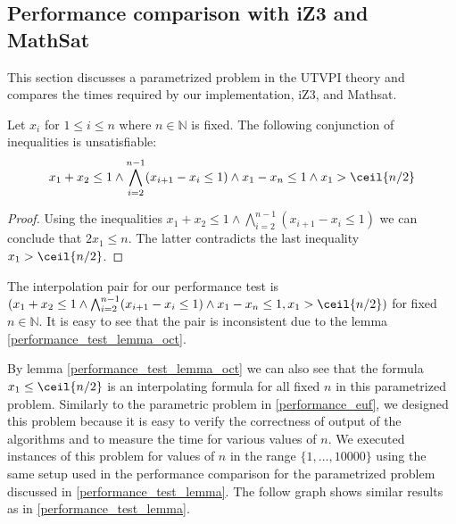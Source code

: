 \subsection{Performance comparison with iZ3 and MathSat}\label{performance_oct}

This section discusses a parametrized problem 
in the UTVPI theory and compares the times required by
our implementation, iZ3, and Mathsat.

\begin{lemma} \label{performance_test_lemma_oct}
  Let $x_i$ for $1 \leq i \leq n$ where $n \in \mathbb{N}$ is fixed.
  The following conjunction of inequalities is unsatisfiable:
  \begin{equation*}\label{oct_problem}
    x_1 + x_2 \leq 1 
    \land \bigwedge_{i=2}^{n-1} (x_{i+1} - x_i \leq 1) 
    \land x_1 - x_n \leq 1
    \land x_1 > \ceil{n/2}
  \end{equation*}
\end{lemma}

\begin{proof}
  Using the inequalities $x_1 + x_2 \leq 1 
  \land \bigwedge_{i=2}^{n-1} (x_{i+1} - x_i \leq 1)$
  we can conclude that $2x_1 \leq n$.
  The latter contradicts the last inequality $x_1 > \ceil{n/2}$.
\end{proof}

The interpolation pair for our performance test 
is $(x_1 + x_2 \leq 1 
  \land \bigwedge_{i=2}^{n-1} (x_{i+1} - x_i \leq 1) 
\land x_1 - x_n \leq 1, x_1 > \ceil{n/2})$
for fixed $n \in \mathbb{N}$.
It is easy to see that the pair is inconsistent due to the lemma 
\ref{performance_test_lemma_oct}. 

By lemma \ref{performance_test_lemma_oct}
we can also see that the formula $x_1 \leq \ceil{n/2}$ is an 
interpolating formula for all fixed $n$ in this parametrized problem.
Similarly to the parametric problem in \ref{performance_euf}, 
we designed this problem because it is easy to verify the 
correctness of output of the algorithms and to measure 
the time for various values of $n$. 
We executed instances of this problem for values of $n$
in the range $\{1, \dots, 10000\}$ using the same setup 
used in the performance comparison for the parametrized 
problem discussed in \ref{performance_test_lemma}.
The follow graph shows similar results as 
in \ref{performance_test_lemma}.

